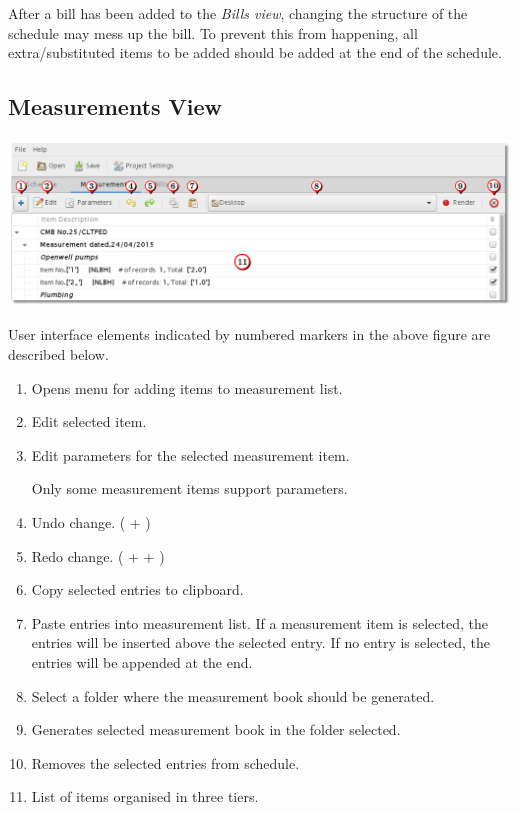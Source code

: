 \documentclass[twoside,a4paper]{refart}
\newenvironment{noteblock}[1]%
{\begin{mdframed}[topline=false,bottomline=false, rightline=false,
		linewidth=2pt, frametitle={#1}]}%
		{\end{mdframed}}
\begin{document}
	 \begin{noteblock}{Note:}
	 	After a bill has been added to the \emph{Bills view}, changing the structure of the schedule may mess up the bill. To prevent this from happening, all extra/substituted items to be added should be added at the end of the schedule.
	 \end{noteblock}
	 
	 \subsection{Measurements View}
	 
	 \begin{maxipage}
	 	\includegraphics[width=1\linewidth]{screenshots/window_meas.png}
	 \end{maxipage}
	 
	 User interface elements indicated by numbered markers in the above figure are described below.
	 
	 \begin{enumerate}
	 	\item Opens menu for adding items to measurement list.
	 	\item Edit selected item.
	 	\item Edit parameters for the selected measurement item. \\
	 	\begin{noteblock}{Note:}
	 		Only some measurement items support parameters.
	 	\end{noteblock}
	 	\item Undo change. ( + )
	 	\item Redo change. ( +  + )	 
	 	\item Copy selected entries to clipboard.
	 	\item Paste entries into measurement list. If a measurement item is selected, the entries will be inserted above the selected entry. If no entry is selected, the entries will be appended at the end.
	 	\item Select a folder where the measurement book should be generated.
	 	\item Generates selected measurement book in the folder selected.
	 	\item Removes the selected entries from schedule.
	 	\item List of items organised in three tiers.
	 \end{enumerate}
	 
\end{document}
